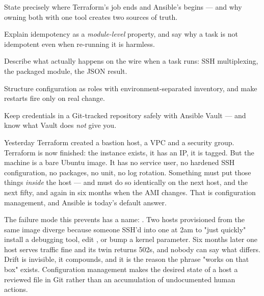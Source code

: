 
\begin{objectives}
\begin{wbitem}
  \item State precisely where Terraform's job ends and Ansible's begins --- and why owning both with one tool creates two sources of truth.
  \item Explain idempotency as a \emph{module-level} property, and say why a  task is not idempotent even when re-running it is harmless.
  \item Describe what actually happens on the wire when a task runs: SSH multiplexing, the packaged module, the JSON result.
  \item Structure configuration as roles with environment-separated inventory, and make restarts fire only on real change.
  \item Keep credentials in a Git-tracked repository safely with Ansible Vault --- and know what Vault does \emph{not} give you.
\end{wbitem}
\end{objectives}


 Yesterday Terraform created a bastion host, a VPC and a security group. Terraform is now finished: the instance exists, it has an IP, it is tagged. But the machine is a bare Ubuntu image. It has no service user, no hardened SSH configuration, no packages, no  unit, no log rotation. Something must put those things \emph{inside} the host --- and must do so identically on the next host, and the next fifty, and again in six months when the AMI changes. That is configuration management, and Ansible is today's default answer.

 The failure mode this prevents has a name: . Two hosts provisioned from the same image diverge because someone SSH'd into one at 2am to "just quickly" install a debugging tool, edit , or bump a kernel parameter. Six months later one host serves traffic fine and its twin returns 502s, and nobody can say what differs. Drift is invisible, it compounds, and it is the reason the phrase "works on that box" exists. Configuration management makes the desired state of a host a reviewed file in Git rather than an accumulation of undocumented human actions.

